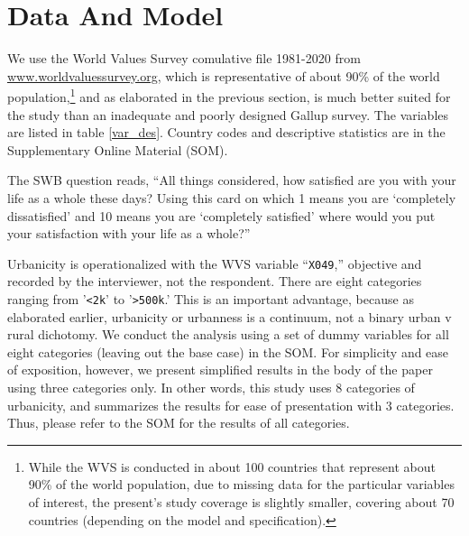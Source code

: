 \documentclass[10pt, letterpaper]{article}
\begin{document}
\section*{Data And Model}

We use the World Values Survey comulative file 1981-2020 from \url{www.worldvaluessurvey.org}, which is representative of about 90\% of
the world population,\footnote{While the WVS is conducted in about 100 countries
  that represent about 90\% of the world population, due to missing data for
  the particular variables of interest, the present's study coverage is slightly
smaller, covering about 70 countries (depending on the model and specification).} and as elaborated in the previous section, is much better suited for the study than an inadequate and poorly designed Gallup survey. The variables are listed in table \ref{var_des}. 
Country codes and descriptive statistics are in the Supplementary Online
Material (SOM).  %

The SWB question reads, ``All things considered, how  satisfied are you with your life as a whole these days? Using this card on which 1 means you are `completely dissatisfied' and 10 means you are `completely satisfied' where would you put your satisfaction with your life as a whole?''

Urbanicity is operationalized with the WVS variable ``\texttt{X049},'' objective and recorded by the interviewer, not the respondent.
There are eight categories ranging from '\texttt{<2k}' to '\texttt{>500k}.' This is an
important advantage, because as elaborated earlier, urbanicity or urbanness is a
continuum, not a binary urban v rural dichotomy. We conduct the analysis using a
set of dummy variables for all eight categories (leaving out the base case) in
the SOM. For simplicity and ease of exposition, however,  we present simplified results in the body of the paper using three categories only.
In other words, this study uses 8 categories of urbanicity, and summarizes the results for ease of presentation with 3 categories. Thus, please refer to the SOM for the results of all categories.
\end{document}
